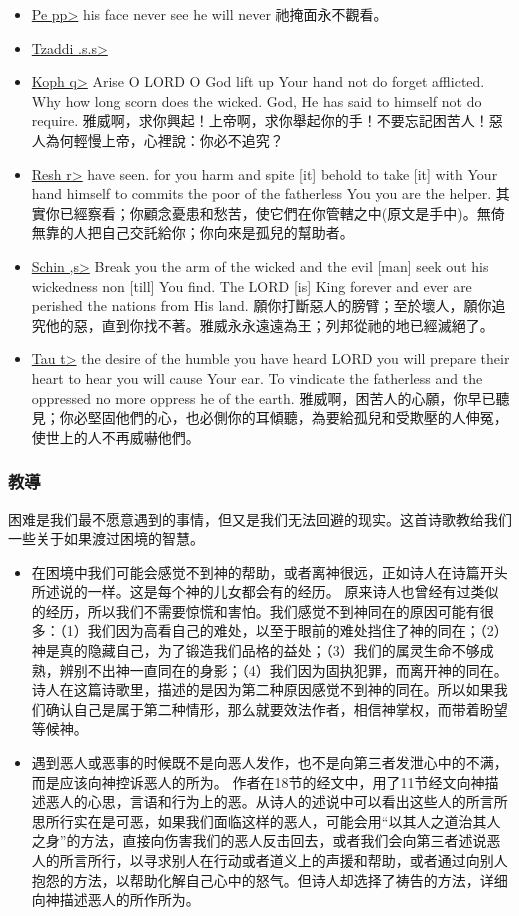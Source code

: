 \begin{itemize}
\item \underline{Pe \<pp>} his face never see he will never 祂掩面永不觀看。
\item \underline{Tzaddi \<.s.s>} 
\item \underline{Koph \<q>} Arise O LORD O God lift up Your hand not do forget afflicted. Why how long scorn does the wicked. God, He has said to himself not do require. 雅威啊，求你興起！上帝啊，求你舉起你的手！不要忘記困苦人！惡人為何輕慢上帝，心裡說：你必不追究？
\item \underline{Resh  \<r>} have seen. for you harm and spite [it] behold to take [it] with Your hand himself to commits the poor of the fatherless You you are the helper. 其實你已經察看；你顧念憂患和愁苦，使它們在你管轄之中(原文是手中)。無倚無靠的人把自己交託給你；你向來是孤兒的幫助者。
\item \underline{Schin \<,s>} Break you the arm of the wicked and the evil [man] seek out his wickedness non [till] You find. The LORD [is] King forever and ever are perished the nations from His land. 願你打斷惡人的膀臂；至於壞人，願你追究他的惡，直到你找不著。雅威永永遠遠為王；列邦從祂的地已經滅絕了。
\item \underline{Tau \<t>} the desire of the humble you have heard LORD you will prepare their heart to hear you will cause Your ear. To vindicate the fatherless and the oppressed no more oppress he of the earth. 雅威啊，困苦人的心願，你早已聽見；你必堅固他們的心，也必側你的耳傾聽，為要給孤兒和受欺壓的人伸冤，使世上的人不再威嚇他們。
\end{itemize}
\subsubsection{教導}
困难是我们最不愿意遇到的事情，但又是我们无法回避的现实。这首诗歌教给我们一些关于如果渡过困境的智慧。
\begin{itemize}
\itemsep-.45em  
\item 在困境中我们可能会感觉不到神的帮助，或者离神很远，正如诗人在诗篇开头所述说的一样。这是每个神的儿女都会有的经历。
原来诗人也曾经有过类似的经历，所以我们不需要惊慌和害怕。我们感觉不到神同在的原因可能有很多：（1）我们因为高看自己的难处，以至于眼前的难处挡住了神的同在；（2）神是真的隐藏自己，为了锻造我们品格的益处；（3）我们的属灵生命不够成熟，辨别不出神一直同在的身影；（4）我们因为固执犯罪，而离开神的同在。诗人在这篇诗歌里，描述的是因为第二种原因感觉不到神的同在。所以如果我们确认自己是属于第二种情形，那么就要效法作者，相信神掌权，而带着盼望等候神。
\item 遇到恶人或恶事的时候既不是向恶人发作，也不是向第三者发泄心中的不满，而是应该向神控诉恶人的所为。
作者在18节的经文中，用了11节经文向神描述恶人的心思，言语和行为上的恶。从诗人的述说中可以看出这些人的所言所思所行实在是可恶，如果我们面临这样的恶人，可能会用“以其人之道治其人之身”的方法，直接向伤害我们的恶人反击回去，或者我们会向第三者述说恶人的所言所行，以寻求别人在行动或者道义上的声援和帮助，或者通过向别人抱怨的方法，以帮助化解自己心中的怒气。但诗人却选择了祷告的方法，详细向神描述恶人的所作所为。
\end{itemize}



